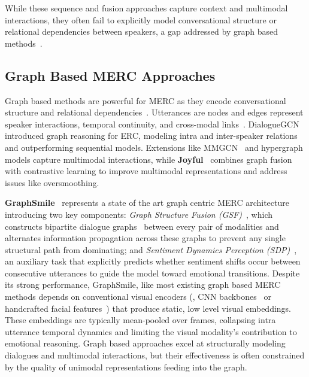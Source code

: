 \documentclass[runningheads]{llncs}
\begin{document}
While these sequence and fusion approaches capture context and multimodal interactions, they often fail to explicitly model conversational structure or relational dependencies between speakers, a gap addressed by graph based methods~\cite{ghosal2019dialoguegcn,hu2021mmgcn,li2024graphsmile}.\subsection{Graph Based MERC Approaches}

Graph based methods are powerful for MERC as they encode conversational structure and relational dependencies~\cite{hu2021mmgcn,li2024graphsmile}. Utterances are nodes and edges represent speaker interactions, temporal continuity, and cross-modal links~\cite{kipf2017gcn}. DialogueGCN~\cite{ghosal2019dialoguegcn} introduced graph reasoning for ERC, modeling intra and inter-speaker relations and outperforming sequential models. Extensions like MMGCN~\cite{hu2021mmgcn} and hypergraph models capture multimodal interactions, while \textbf{Joyful}~\cite{li-etal-2023-joyful} combines graph fusion with contrastive learning to improve multimodal representations and address issues like oversmoothing.

\textbf{GraphSmile}~\cite{li2024graphsmile} represents a state of the art graph centric MERC architecture introducing two key components: \textit{Graph Structure Fusion (GSF)}~\cite{li2024graphsmile}, which constructs bipartite dialogue graphs~\cite{hu2021mmgcn} between every pair of modalities and alternates information propagation across these graphs to prevent any single structural path from dominating; and \textit{Sentiment Dynamics Perception (SDP)}~\cite{li2024graphsmile}, an auxiliary task that explicitly predicts whether sentiment shifts occur between consecutive utterances to guide the model toward emotional transitions.
Despite its strong performance, GraphSmile, like most existing graph based MERC methods depends on conventional visual encoders (\eg, CNN backbones~\cite{he2016resnet} or handcrafted facial features~\cite{baltrusaitis2018openface}) that produce static, low level visual embeddings. These embeddings are typically mean-pooled over frames, collapsing intra utterance temporal dynamics and limiting the visual modality's contribution to emotional reasoning. Graph based approaches excel at structurally modeling dialogues and multimodal interactions, but their effectiveness is often constrained by the quality of unimodal representations feeding into the graph.
\end{document}
